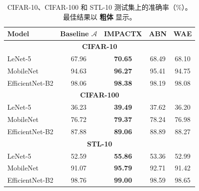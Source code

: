 \documentclass[12pt, a4paper]{ctexart} %
\begin{document}
\begin{table}[h]
    \centering
    \caption{CIFAR-10、CIFAR-100 和 STL-10 测试集上的准确率（\%）。最佳结果以 \textbf{粗体} 显示。}
    \label{tab:accuracy_results}
    \begin{tabular}{l|c|c|c|c}
        \hline
        \textbf{Model} & \textbf{Baseline \( \mathcal{A} \)} & \textbf{IMPACTX} & \textbf{ABN } & \textbf{WAE } \\ 
        \hline
        \multicolumn{5}{c}{\textbf{CIFAR-10}} \\ 
        \hline
        LeNet-5 & 67.96 & \textbf{70.65} & 68.49 & 68.10 \\ 
        MobileNet & 94.63 & \textbf{96.27} & 95.41 & 94.75 \\ 
        EfficientNet-B2 & 98.06 & \textbf{98.38} & 98.19 & 98.08 \\ 
        \hline
        \multicolumn{5}{c}{\textbf{CIFAR-100}} \\ 
        \hline
        LeNet-5 & 36.23 & \textbf{39.49} & 37.62 & 36.20 \\ 
        MobileNet & 76.72 & \textbf{79.37} & 78.24 & 76.98 \\ 
        EfficientNet-B2 & 87.88 & \textbf{89.06} & 88.89 & 88.27 \\ 
        \hline
        \multicolumn{5}{c}{\textbf{STL-10}} \\ 
        \hline
        LeNet-5 & 52.59 & \textbf{55.86} & 53.36 & 52.99 \\ 
        MobileNet & 91.07 & \textbf{95.79} & 92.71 & 91.42 \\ 
        EfficientNet-B2 & 98.76 & \textbf{99.00} & 98.59 & 98.65 \\ 
        \hline
    \end{tabular}
\end{table}
\end{document}
